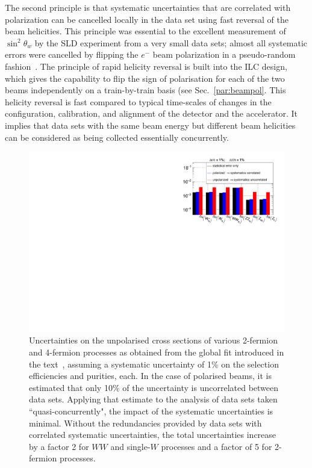 The second principle is that systematic uncertainties that are correlated with polarization can be cancelled locally in the data set using fast reversal of the beam helicities.  This principle 
was essential to the excellent measurement of $\sin^2\theta_w$ by the SLD experiment 
from a very small data sets; almost all systematic errors were cancelled by flipping the $e^-$ beam  polarization in a pseudo-random fashion~\cite{Abe:1996nj}.   The principle of rapid helicity reversal is built into the ILC design, which gives the capability to flip the sign of 
polarisation for each of the two beams independently on a train-by-train basis (see Sec.~\ref{par:beampol}.  This helicity reversal is fast compared to typical time-scales of changes in the configuration, calibration, and alignment of the detector and the accelerator.
It implies that data sets with the same beam energy but different beam helicities can be considered as being collected  essentially concurrently.  

\begin{figure}
\centering
\includegraphics[width=0.95\linewidth]{./chapters/figures/ElectroWeakSysDependency_alpha_short.pdf}
		
\caption{Uncertainties on the unpolarised cross sections of various 2-fermion and 4-fermion processes as obtained from the global fit introduced in the text~\cite{bib:PhDRobert}, assuming a systematic uncertainty of 1\% on the selection efficiencies and purities, each. In the case of polarised beams, it is estimated that only 10\% of the uncertainty is uncorrelated between data sets.  Applying that estimate to the analysis of data sets taken ``quasi-concurrently", the impact of the systematic uncertainties is minimal.  Without the redundancies provided by data sets with correlated systematic uncertainties, the total uncertainties increase by a factor 2 for $WW$ and single-$W$ processes and a factor of 5 for 2-fermion processes.}
\label{fig:alpha_error_corr_uncorr}
\end{figure}


